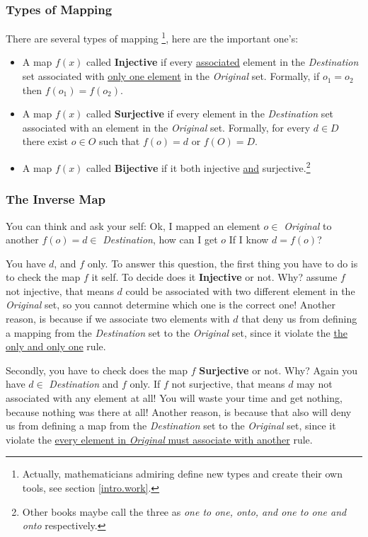 \subsubsection{Types of Mapping}
There are several types of mapping \footnote{Actually, mathematicians admiring define new types and create their own tools, see section \ref{intro.work}.}, here are the important one's:
\begin{itemize}
    \item A map $f(x)$ called {\bf Injective} if every \underline{associated} element in the {\it Destination} set associated with \underline{only one element} in the {\it Original} set. Formally, if $o_1 = o_2$ then $f(o_1) = f(o_2)$.
    \item A map $f(x)$ called {\bf Surjective} if every element in the {\it Destination} set associated with an element in the {\it Original} set. Formally, for every $d \in D$ there exist $o \in O$ such that $f(o)=d$ or $f(O)=D$.
    \item A map $f(x)$ called {\bf Bijective} if it both injective \underline{and} surjective.\footnote{Other books maybe call the three as {\it  one to one, onto, and one to one and onto} respectively.}
\end{itemize}
\subsubsection{The Inverse Map} You can think and ask your self: Ok, I mapped an element $o \in$ {\it Original} to another $f(o) = d \in$ {\it Destination}, how can I get $o$ If I know $d = f(o)$? 

You have $d$, and $f$ only. To answer this question, the first thing you have to do is to check the map $f$ it self. To decide does it {\bf Injective} or not. Why? assume $f$ not injective, that means $d$ could be associated with two different element in the {\it Original} set, so you cannot determine which one is the correct one! Another reason, is because if we associate two elements with $d$ that deny us from defining a mapping from the {\it Destination } set to the {\it Original} set, since it violate the \underline{the only and only one} rule.

Secondly, you have to check does the map $f$ {\bf Surjective} or not. Why? Again you have $d \in$ {\it Destination} and $f$ only. If $f$ not surjective, that means $d$ may not associated with any element at all! You will waste your time and get nothing, because nothing was there at all! Another reason, is because that also will deny us from defining a map from the {\it Destination } set to the {\it Original} set, since it violate the \underline{every element in {\it Original} must associate with another} rule.

